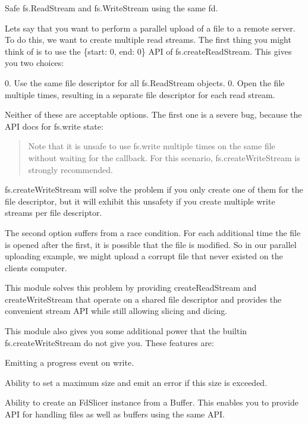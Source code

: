 \href{https://travis-ci.org/andrewrk/node-fd-slicer}{\tt } \href{https://coveralls.io/r/andrewrk/node-fd-slicer}{\tt }

Safe {\ttfamily fs.\+Read\+Stream} and {\ttfamily fs.\+Write\+Stream} using the same fd.

Let\textquotesingle{}s say that you want to perform a parallel upload of a file to a remote server. To do this, we want to create multiple read streams. The first thing you might think of is to use the {\ttfamily \{start\+: 0, end\+: 0\}} A\+PI of {\ttfamily fs.\+create\+Read\+Stream}. This gives you two choices\+:

0. Use the same file descriptor for all {\ttfamily fs.\+Read\+Stream} objects. 0. Open the file multiple times, resulting in a separate file descriptor for each read stream.

Neither of these are acceptable options. The first one is a severe bug, because the A\+PI docs for {\ttfamily fs.\+write} state\+:

\begin{quote}
Note that it is unsafe to use {\ttfamily fs.\+write} multiple times on the same file without waiting for the callback. For this scenario, {\ttfamily fs.\+create\+Write\+Stream} is strongly recommended. \end{quote}


{\ttfamily fs.\+create\+Write\+Stream} will solve the problem if you only create one of them for the file descriptor, but it will exhibit this unsafety if you create multiple write streams per file descriptor.

The second option suffers from a race condition. For each additional time the file is opened after the first, it is possible that the file is modified. So in our parallel uploading example, we might upload a corrupt file that never existed on the client\textquotesingle{}s computer.

This module solves this problem by providing {\ttfamily create\+Read\+Stream} and {\ttfamily create\+Write\+Stream} that operate on a shared file descriptor and provides the convenient stream A\+PI while still allowing slicing and dicing.

This module also gives you some additional power that the builtin {\ttfamily fs.\+create\+Write\+Stream} do not give you. These features are\+:


\begin{DoxyItemize}
\item Emitting a \textquotesingle{}progress\textquotesingle{} event on write.
\item Ability to set a maximum size and emit an error if this size is exceeded.
\item Ability to create an {\ttfamily Fd\+Slicer} instance from a {\ttfamily Buffer}. This enables you to provide A\+PI for handling files as well as buffers using the same A\+PI.
\end{DoxyItemize}

